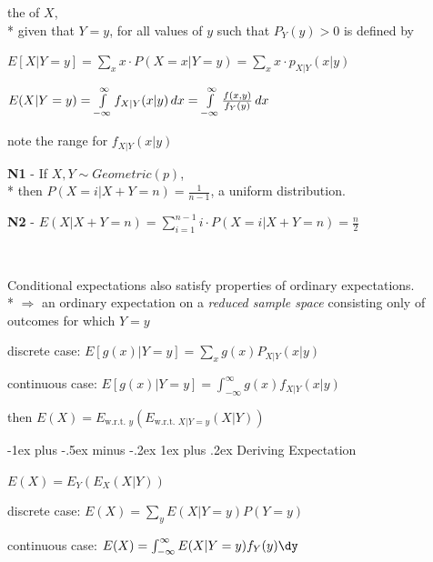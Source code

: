 \documentclass[10pt, landscape]{article}
\makeatletter
\renewcommand{\subsubsection}{\@startsection{subsubsection}{3}{0mm}%
  {-1ex plus -.5ex minus -.2ex}%
  {1ex plus .2ex}%
{\normalfont\small\bfseries}}%
\makeatother
\begin{document}
\begin{multicols*}{3}
    the  of $X$, 
    \\* given that $Y=y$, for all values of  $y$ such that $P_Y(y) > 0$ is defined by

    \begin{tightcenter}
      $E[X \vert Y=y] = \sum\limits_x x \cdot P(X=x \vert Y=y) = \sum\limits_x x \cdot p_{X \vert Y} (x \vert y)$

      $E(X \vert Y=y) = \int\limits^\infty_{-\infty} f_{X \vert Y}(x \vert y) \mathop{dx} = \int\limits^\infty_{-\infty} \frac{f(x, y)}{f_Y(y)} \mathop{dx}$

      \attention note the range for $f_{X \vert Y}(x \vert y)$
    \end{tightcenter}

    \textbf{N1} - If $X, Y \sim Geometric(p)$, 
    \\* then $P(X=i \vert X+Y=n) = \frac{1}{n-1}$, a uniform distribution.

    \textbf{N2} - $E(X \vert X+Y=n) = \sum^{n-1}_{i=1} i \cdot P(X=i \vert X+Y=n) = \frac{n}{2}$

    \ 

    Conditional expectations also satisfy properties of ordinary expectations. 
    \\* $\Rightarrow$ an ordinary expectation on a \textit{reduced sample space} consisting only of outcomes for which $Y=y$

    \begin{tightcenter}
      discrete case: $E[g(x) \vert Y=y] = \sum\limits_x g(x) P_{X \vert Y} (x \vert y)$

      continuous case: $E[g(x) \vert Y=y] = \int^\infty_{-\infty} g(x) f_{X \vert Y} (x \vert y)$

      then $E(X) = E_{ \text{w.r.t. } y} (E_{ \text{w.r.t. } X \vert Y=y}(X \vert Y)) $
    \end{tightcenter}

    \subsubsection{Deriving Expectation}

    $E(X) = E_Y(E_X(X \vert Y))$

    \begin{tightcenter}
      discrete case: $E(X) = \sum\limits_y E(X \vert Y=y) P(Y=y)$

      continuous case: $E(X) = \int^\infty_{-\infty} E(X \vert Y=y)f_Y(y) \dy$
    \end{tightcenter}


\end{multicols*}
\end{document}
